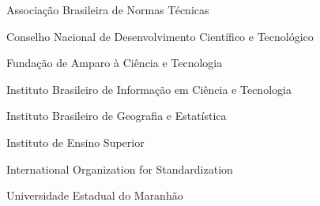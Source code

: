 \begin{siglas}
  \item[ABNT] Associação Brasileira de Normas Técnicas
  \item[CNPq] Conselho Nacional de Desenvolvimento Científico e Tecnológico
  \item[FACT] Fundação de Amparo à Ciência e Tecnologia
  \item[IBICT] Instituto Brasileiro de Informação em Ciência e Tecnologia
  \item[IBGE] Instituto Brasileiro de Geografia e Estatística
  \item[IES] Instituto de Ensino Superior
  \item[ISO] International Organization for Standardization
  \item[UEMA] Universidade Estadual do Maranhão
\end{siglas}

